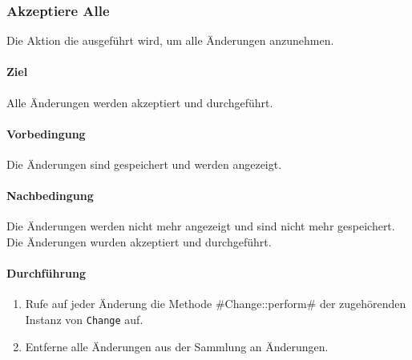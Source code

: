 \subsubsection{Akzeptiere Alle}

Die Aktion die ausgeführt wird, um alle Änderungen anzunehmen.

\paragraph*{Ziel}
Alle Änderungen werden akzeptiert und durchgeführt.

\paragraph*{Vorbedingung}
Die Änderungen sind gespeichert und werden angezeigt.

\paragraph*{Nachbedingung}
Die Änderungen werden nicht mehr angezeigt und sind nicht mehr gespeichert. Die Änderungen wurden akzeptiert und durchgeführt.

\paragraph*{Durchführung}
\begin{enumerate}
    \item Rufe auf jeder Änderung die Methode \ver#Change::perform#  der zugehörenden Instanz von \verb#Change# auf.
    \item Entferne alle Änderungen aus der Sammlung an Änderungen.
\end{enumerate}